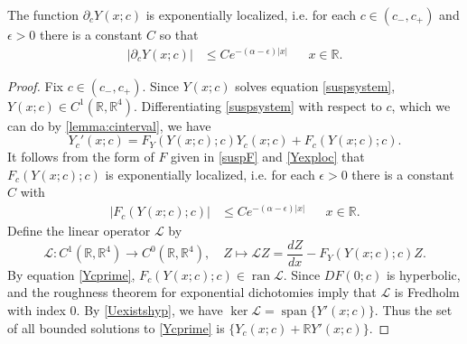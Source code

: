 \documentclass[review,onefignum,onetabnum]{siamart171218}
\newcommand{\R}{\mathbb{R}}
\def\ker{\mathop\mathrm{ker}\nolimits}
\def\Ran{\mathop\mathrm{ran}\nolimits}
\def\Span{\mathop\mathrm{span}\nolimits}
\newcommand{\calL}{\mathcal{L}}
\begin{document}
\begin{lemma}\label{lemma:Ycexploc}
The function $\partial_c Y(x; c)$ is exponentially localized, i.e. for each $c \in (c_-, c_+)$ and $\epsilon > 0$ there is a constant $C$ so that
\begin{align}\label{Ycexploc}
|\partial_c Y(x; c)| &\leq C e^{-(\alpha - \epsilon)|x|} && x \in \R.
\end{align}
\begin{proof}
Fix $c \in (c_-, c_+)$. Since $Y(x; c)$ solves equation \cref{suspsystem}, $Y(x; c) \in C^1(\R, \R^4)$. Differentiating \cref{suspsystem} with respect to $c$, which we can do by \cref{lemma:cinterval}, we have
\begin{equation}\label{Ycprime}
Y_c'(x; c) = F_Y(Y(x;c); c) Y_c(x; c) + F_c(Y(x;c); c).
\end{equation}
It follows from the form of $F$ given in \cref{suspF} and \cref{Yexploc} that $F_c(Y(x;c); c)$ is exponentially localized, i.e. for each $\epsilon > 0$ there is a constant $C$ with
\begin{align}\label{Fcexploc}
|F_c(Y(x;c); c)| &\leq C e^{-(\alpha - \epsilon)|x|} && x \in \R.
\end{align}
Define the linear operator $\calL$ by
\begin{equation}\label{suspdefL}
\calL: C^1(\R, \R^4) \to C^0(\R, \R^4),\quad
Z \mapsto \calL Z = \frac{dZ}{dx} - F_Y(Y(x;c); c) Z.
\end{equation}
By equation \cref{Ycprime}, $F_c(Y(x;c); c) \in \Ran \calL$. Since $DF(0; c)$ is hyperbolic, \cite[Lemma~4.2]{Palmer1984} and the roughness theorem for exponential dichotomies \cite{Coppel1978} imply that $\calL$ is Fredholm with index 0. By \cref{Uexistshyp}, we have $\ker \calL = \Span\{Y'(x; c)\}$. Thus the set of all bounded solutions to \cref{Ycprime} is $\{Y_c(x; c) + \R Y'(x; c)\}$.


\end{proof}
\end{lemma}
\end{document}
